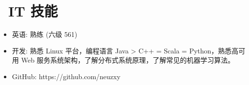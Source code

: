 \documentclass{resume}
\begin{document}
\section{\faCogs\ IT 技能}
\begin{itemize}[parsep=0.5ex]
  \item 英语: 熟练 (六级 561)
  \item 开发: 熟悉 Linux 平台，编程语言 Java > C++ = Scala = Python，熟悉高可用 Web 服务系统架构，了解分布式系统原理，了解常见的机器学习算法。
  \item GitHub: https://github.com/neuzxy
\end{itemize}

%

%
%
\end{document}
